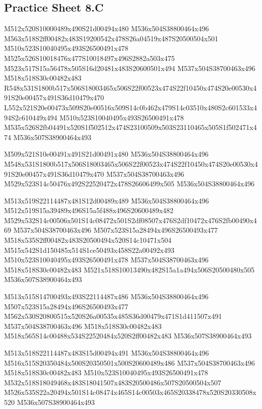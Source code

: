 \documentclass{article}
\begin{document}
\subsection{Practice Sheet 8.C}

\begin{multicols}{5}
\begin{center}

M512x520S10000489x490S21d00494x480 %
M536x504S38800464x496 %
M563x518S2ff00482x483S19200542x478S26a04519x487S20500504x501 %
M510x523S10040495x493S26500491x478 %
M525x526S10018476x477S10018497x496S2882a503x475 %
M523x517S15a56478x505S16d20481x483S20600501x494 %
M537x504S38700463x496 %
M518x518S30c00482x483 %
R548x531S1800b517x506S18003465x506S22f00523x474S22f10450x474S20e00530x491S20e00457x491S36d10479x470 %
L552x521S20e00473x509S20e00516x509S14c0b462x479S14c03510x480S2c601533x494S2c610449x494 %
M510x523S10040495x493S26500491x478 %
M535x526S2fb04491x520S1f502512x474S23100509x503S23110465x505S1f502471x474 %
M536x507S38900464x493 %
\vfil
\columnbreak

M509x521S10e00491x491S21d00491x480 %
M536x504S38800464x496 %
M548x531S1800b517x506S18003465x506S22f00523x474S22f10450x474S20e00530x491S20e00457x491S36d10479x470 %
M537x504S38700463x496 %
M529x523S14c50476x492S22520472x478S26606499x505 %
M536x504S38800464x496 %
\vfil
\columnbreak

M513x519S22114487x481S12d00489x489 %
M536x504S38800464x496 %
M512x519S15a39489x496S15a5f488x496S20600489x482 %
M529x532S14c00506x501S14c08472x501S2df08507x476S2df10472x476S2fb00490x469 %
M537x504S38700463x496 %
M507x523S15a28494x496S26500493x477 %
M518x535S2ff00482x483S20500494x520S14c10471x504 %
M515x542S1d150485x514S1ce50493x458S22a00492x493 %
M510x523S10040495x493S26500491x478 %
M537x504S38700463x496 %
M518x518S30c00482x483 %
M521x518S10013490x482S15a1a494x506S20500480x505 %
M536x507S38900464x493 %
\vfil
\columnbreak

M513x515S14700493x493S22114487x486 %
M536x504S38800464x496 %
M507x523S15a28494x496S26500493x477 %
M562x530S20800515x520S26a00535x485S36d00479x471S1d411507x491 %
M537x504S38700463x496 %
M518x518S30c00482x483 %
M518x565S14c00488x534S22520484x520S2ff00482x483 %
M536x507S38900464x493 %
\vfil
\columnbreak

M513x518S22114487x483S15d00494x491 %
M536x504S38800464x496 %
M516x515S20350484x500S20350501x500S20600489x486 %
M537x504S38700463x496 %
M518x518S30c00482x483 %
M510x523S10040495x493S26500491x478 %
M532x518S18049468x483S18041507x483S20500486x507S20500504x507 %
M526x535S22a20494x501S14c08474x465S14c00503x465S20338478x520S20330508x520 %
M536x507S38900464x493 %
\vfil

\end{center}
\end{multicols}
\end{document}
